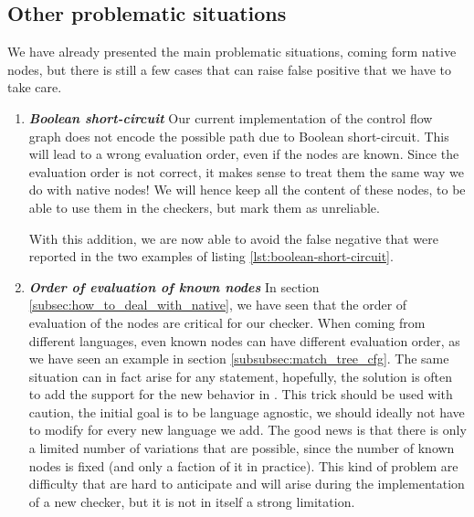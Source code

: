 \subsection{Other problematic situations}
\label{subsec:other_problematic_situation}
	
We have already presented the main problematic situations, coming form native nodes, but there is still a few cases that can raise false positive that we have to take care.

\begin{enumerate}
	\item \textbf{\textit{Boolean short-circuit}} \newline 
	\label{subsubsec:boolean_short_circuit}
	Our current implementation of the control flow graph does not encode the possible path due to Boolean short-circuit. 
	This will lead to a wrong evaluation order, even if the nodes are known. 
	Since the evaluation order is not correct, it makes sense to treat them the same way we do with native nodes! 
	We will hence keep all the content of these nodes, to be able to use them in the checkers, but mark them as unreliable. 


	
	With this addition, we are now able to avoid the false negative that were reported in the two examples of listing \ref{lst:boolean-short-circuit}.
	
	\item \textbf{\textit{Order of evaluation of known nodes}} \newline 
	\label{subsubsec:evaluation_known_nodes}
	In section \ref{subsec:how_to_deal_with_native}, we have seen that the order of evaluation of the nodes are critical for our checker.
	When coming from different languages, even known nodes can have different evaluation order, as we have seen an example in section \ref{subsubsec:match_tree_cfg}. 
	The same situation can in fact arise for any statement, hopefully, the solution is often to add the support for the new behavior in \slang{}.
	This trick should be used with caution, the initial goal is to be language agnostic, we should ideally not have to modify \slang{} for every new language we add. 
	The good news is that there is only a limited number of variations that are possible, since the number of known nodes is fixed (and only a faction of it in practice). 
	This kind of problem are difficulty that are hard to anticipate and will arise during the implementation of a new checker, but it is not in itself a strong limitation.
	

\end{enumerate}

